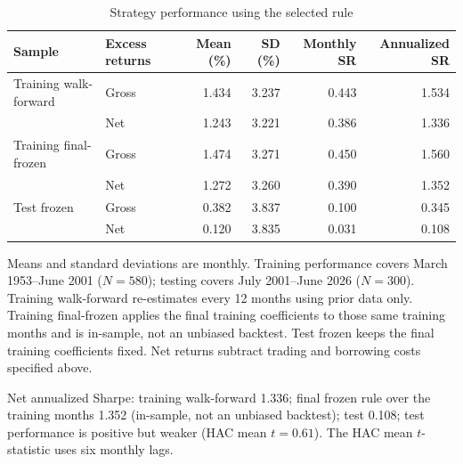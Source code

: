 \documentclass[11pt]{article}
\begin{document}
\begin{table}[htbp]
\centering
\caption{Strategy performance using the selected rule}
\label{tab:performance}
\small
\begin{tabular}{llrrrr}
\toprule
Sample & Excess returns & Mean (\%) & SD (\%) & Monthly SR & Annualized SR\\
\midrule
Training walk-forward & Gross & 1.434 & 3.237 & 0.443 & 1.534\\
                      & Net   & 1.243 & 3.221 & 0.386 & 1.336\\
\addlinespace
Training final-frozen & Gross & 1.474 & 3.271 & 0.450 & 1.560\\
                      & Net   & 1.272 & 3.260 & 0.390 & 1.352\\
\addlinespace
Test frozen           & Gross & 0.382 & 3.837 & 0.100 & 0.345\\
                      & Net   & 0.120 & 3.835 & 0.031 & 0.108\\
\bottomrule
\end{tabular}
\par\smallskip
\begin{minipage}{\textwidth}
\footnotesize
Means and standard deviations are monthly. Training performance covers
March 1953--June 2001 ($N=580$); testing covers July 2001--June 2026 ($N=300$).
Training walk-forward re-estimates every 12 months using prior data only.
Training final-frozen applies the final training coefficients to those same
training months and is in-sample, not an unbiased backtest. Test frozen keeps
the final training coefficients fixed. Net returns subtract trading and
borrowing costs specified above.
\end{minipage}
\end{table}

Net annualized Sharpe: training walk-forward 1.336; final frozen rule over the
training months 1.352 (in-sample, not an unbiased backtest); test 0.108; test
performance is positive but weaker (HAC mean $t=0.61$).
The HAC mean $t$-statistic uses six monthly lags.
\end{document}
